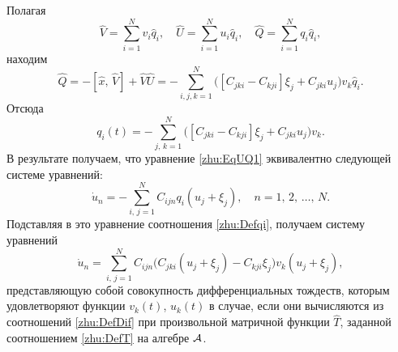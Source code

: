     Полагая
    $$
        \hat{V}=\sum\limits_{i=1}^N v_{i}\hat{q}_i, \quad \hat{U}=\sum\limits_{i=1}^N u_{i}\hat{q}_i, \quad \hat{Q}=\sum\limits_{i=1}^N q_{i}\hat{q}_i,
    $$
    находим
    $$
         \hat{Q}=-[\hat{x},\,\hat{V}]+\hat{V}\hat{U}=-\sum\limits_{i,j,k=1}^N \Big([C_{jki}-C_{kji}]\xi_{j}+C_{jki}
         u_j\Big)v_k\hat{q}_i.
    $$
    Отсюда
    \begin{equation}
    \label{zhu:Defqi}
        q_i(t) =-\sum\limits_{j,\,k=1}^N\Big([C_{jki}-C_{kji}]\xi_{j}+C_{jki}
         u_j\Big)v_{k}.
    \end{equation}
    В результате получаем, что уравнение \eqref{zhu:EqUQ1} эквивалентно
    следующей системе уравнений:
    \begin{equation*}
        \dot{u}_n = -\sum\limits_{i,\,j=1}^N
        C_{ijn}q_i(u_j+\xi_j),\quad n=1,\,2,\,\ldots,\,N.
    \end{equation*}
    Подставляя в это уравнение соотношения \eqref{zhu:Defqi}, получаем
 систему уравнений
    \begin{equation*}
        \dot{u}_n = \sum\limits_{i,\,j=1}^N C_{ijn}\Big(C_{jki}(u_j+\xi_j)-C_{kji}\xi_{j}\Big)v_{k}(u_j+\xi_j),
    \end{equation*}
представляющую собой совокупность
    дифференциальных  тождеств, которым удовлетворяют функции $v_k(t)$, $u_k(t)$
    в случае, если они вычисляются из соотношений
    \eqref{zhu:DefDif} при произвольной матричной функции $\hat{T}$, заданной
    соотношением \eqref{zhu:DefT} на алгебре $\cal A$.

\smallskip


